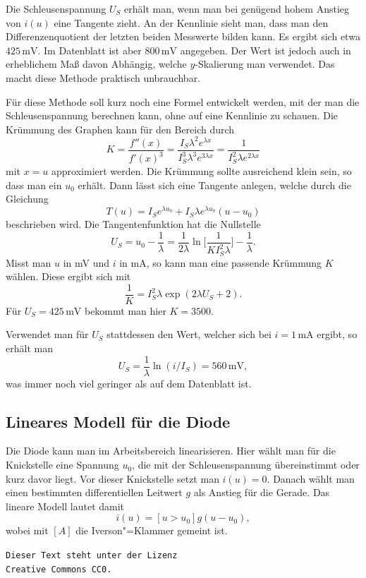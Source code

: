 \documentclass[a4paper,10pt,fleqn,twocolumn,twoside,dvipdfmx]{scrartcl}
\numberwithin{equation}{section}
\begin{document}
Die Schleusenspannung $U_S$ erhält man,
wenn man bei genügend hohem Anstieg von $i(u)$ eine Tangente
zieht. An der Kennlinie sieht man, dass man den Differenzenquotient
der letzten beiden Messwerte bilden kann. Es ergibt sich etwa
$425\,\mathrm{mV}$. Im Datenblatt ist aber $800\,\mathrm{mV}$
angegeben. Der Wert ist jedoch auch in erheblichem
Maß davon Abhängig, welche $y$-Skalierung man verwendet.
Das macht diese Methode praktisch unbrauchbar.

Für diese Methode soll kurz noch eine Formel entwickelt werden,
mit der man die Schleusenspannung berechnen kann, ohne
auf eine Kennlinie zu schauen. Die Krümmung des Graphen kann für den
Bereich durch%
\begin{equation}
K = \frac{f''(x)}{f'(x)^3}
= \frac{I_S\lambda^2 e^{\lambda x}}{I_S^3\lambda^3 e^{3\lambda x}}
= \frac{1}{I_S^2\lambda e^{2\lambda x}}
\end{equation}
mit $x=u$ approximiert werden. Die Krümmung sollte ausreichend
klein sein, so dass man ein $u_0$ erhält.
Dann lässt sich eine Tangente anlegen, welche
durch die Gleichung%
\begin{equation}
T(u) = I_S e^{\lambda u_0}+I_S \lambda e^{\lambda u_0}(u-u_0)
\end{equation}
beschrieben wird. Die Tangentenfunktion hat die Nullstelle%
\begin{equation}
U_S = u_0-\frac{1}{\lambda} = \frac{1}{2\lambda}
\ln\bigg[\frac{1}{KI_S^2\lambda}\bigg]-\frac{1}{\lambda}.
\end{equation}
Misst man $u$ in mV und $i$ in mA, so kann man eine passende
Krümmung $K$ wählen. Diese ergibt sich mit%
\begin{equation}
\frac{1}{K} = I_S^2\lambda\exp(2\lambda U_S+2).
\end{equation}
Für $U_S=425\,\mathrm{mV}$ bekommt man hier $K=3500$.

Verwendet man für $U_S$ stattdessen den Wert, welcher sich
bei $i=1\,\mathrm{mA}$ ergibt, so erhält man%
\begin{equation}
U_S = \frac{1}{\lambda}\ln(i/I_S) = 560\,\mathrm{mV},
\end{equation}
was immer noch viel geringer als auf dem Datenblatt ist.

\subsection{Lineares Modell für die Diode}
Die Diode kann man im Arbeitsbereich linearisieren.
Hier wählt man für die Knickstelle eine Spannung $u_0$,
die mit der Schleusenspannung übereinstimmt oder kurz davor
liegt. Vor dieser Knickstelle setzt man $i(u)=0$. Danach
wählt man einen bestimmten differentiellen Leitwert $g$
als Anstieg für die Gerade. Das lineare Modell lautet
damit%
\begin{equation}
i(u) = [u>u_0]g(u-u_0),
\end{equation}
wobei mit $[A]$ die Iverson"=Klammer gemeint ist.

\vfill\noindent
\texttt{Dieser Text steht unter der Lizenz\\
Creative Commons CC0.}
\end{document}
